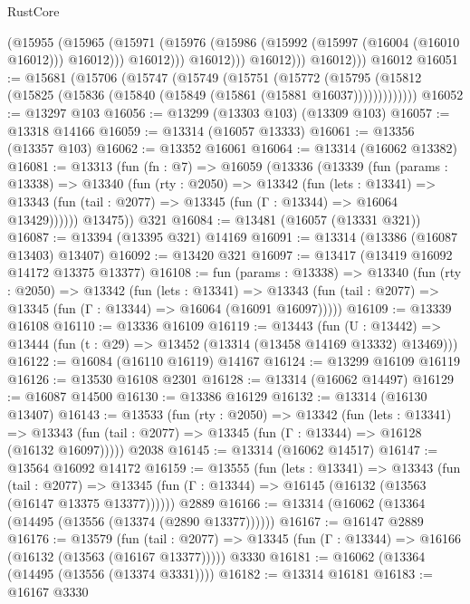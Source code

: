 \begin{lexlean}{RustCore}
\begin{coremodule}
                      (@15955
                        (@15965
                          (@15971
                            (@15976 (@15986 (@15992 (@15997 (@16004 (@16010 @16012))) @16012)))
                            @16012)))
                      @16012)))
                @16012)))
          @16012)))
    @16012
@16051 := @15681
    (@15706
      (@15747
        (@15749
          (@15751
            (@15772
              (@15795 (@15812 (@15825 (@15836 (@15840 (@15849 (@15861 (@15881 @16037)))))))))))))
@16052 := @13297 @103
@16056 := @13299 (@13303 @103) (@13309 @103)
@16057 := @13318 @14166
@16059 := @13314 (@16057 @13333)
@16061 := @13356 (@13357 @103)
@16062 := @13352 @16061
@16064 := @13314 (@16062 @13382)
@16081 := @13313
    (fun (fn : @7) =>
    @16059
      (@13336
        (@13339
          (fun (params : @13338) =>
          @13340
            (fun (rty : @2050) =>
            @13342
              (fun (lets : @13341) =>
              @13343 (fun (tail : @2077) => @13345 (fun (Γ : @13344) => @16064 @13429))))))
        @13475))
    @321
@16084 := @13481 (@16057 (@13331 @321))
@16087 := @13394 (@13395 @321) @14169
@16091 := @13314 (@13386 (@16087 @13403) @13407)
@16092 := @13420 @321
@16097 := @13417 (@13419 @16092 @14172 @13375 @13377)
@16108 := fun (params : @13338) =>
  @13340
    (fun (rty : @2050) =>
    @13342
      (fun (lets : @13341) =>
      @13343 (fun (tail : @2077) => @13345 (fun (Γ : @13344) => @16064 (@16091 @16097)))))
@16109 := @13339 @16108
@16110 := @13336 @16109
@16119 := @13443
    (fun (U : @13442) => @13444 (fun (t : @29) => @13452 (@13314 (@13458 @14169 @13332) @13469)))
@16122 := @16084 (@16110 @16119) @14167
@16124 := @13299 @16109 @16119
@16126 := @13530 @16108 @2301
@16128 := @13314 (@16062 @14497)
@16129 := @16087 @14500
@16130 := @13386 @16129
@16132 := @13314 (@16130 @13407)
@16143 := @13533
    (fun (rty : @2050) =>
    @13342
      (fun (lets : @13341) =>
      @13343 (fun (tail : @2077) => @13345 (fun (Γ : @13344) => @16128 (@16132 @16097)))))
    @2038
@16145 := @13314 (@16062 @14517)
@16147 := @13564 @16092 @14172
@16159 := @13555
    (fun (lets : @13341) =>
    @13343
      (fun (tail : @2077) =>
      @13345 (fun (Γ : @13344) => @16145 (@16132 (@13563 (@16147 @13375 @13377))))))
    @2889
@16166 := @13314 (@16062 (@13364 (@14495 (@13556 (@13374 (@2890 @13377))))))
@16167 := @16147 @2889
@16176 := @13579
    (fun (tail : @2077) => @13345 (fun (Γ : @13344) => @16166 (@16132 (@13563 (@16167 @13377)))))
    @3330
@16181 := @16062 (@13364 (@14495 (@13556 (@13374 @3331))))
@16182 := @13314 @16181
@16183 := @16167 @3330

\end{coremodule}
\end{lexlean}
